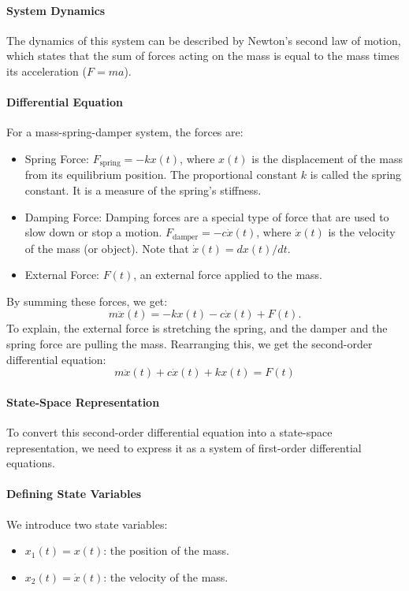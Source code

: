 \paragraph{System Dynamics} The dynamics of this system can be described by Newton's second law of motion, which states that the sum of forces acting on the mass is equal to the mass times its acceleration (\(F = ma\)).

\paragraph{Differential Equation} For a mass-spring-damper system, the forces are:
\begin{itemize}
	\item Spring Force: \( F_{\text{spring}} = -kx(t) \), where \( x(t) \) is the displacement of the mass from its equilibrium position. The proportional constant $k$ is called the spring constant. It is a measure of the spring's stiffness.
	\item Damping Force: Damping forces are a special type of force that are used to slow down or stop a motion.  \( F_{\text{damper}} = -c\dot{x}(t) \), where \( \dot{x}(t) \) is the velocity of the mass (or object). Note that $\dot{x}(t)=dx(t)/dt$.
	\item External Force: \( F(t) \), an external force applied to the mass.
\end{itemize}

By summing these forces, we get:
\[ m\ddot{x}(t) = -kx(t) - c\dot{x}(t) + F(t). \]
To explain, the external force is stretching the spring, and the damper and the spring force are pulling the mass. Rearranging this, we get the second-order differential equation:
\[ m\ddot{x}(t) + c\dot{x}(t) + kx(t) = F(t) \]

\paragraph{State-Space Representation} To convert this second-order differential equation into a state-space representation, we need to express it as a system of first-order differential equations.

\paragraph{Defining State Variables} We introduce two state variables:
\begin{itemize}
	\item \( x_1(t) = x(t) \): the position of the mass.
	\item \( x_2(t) = \dot{x}(t) \): the velocity of the mass.
\end{itemize}

